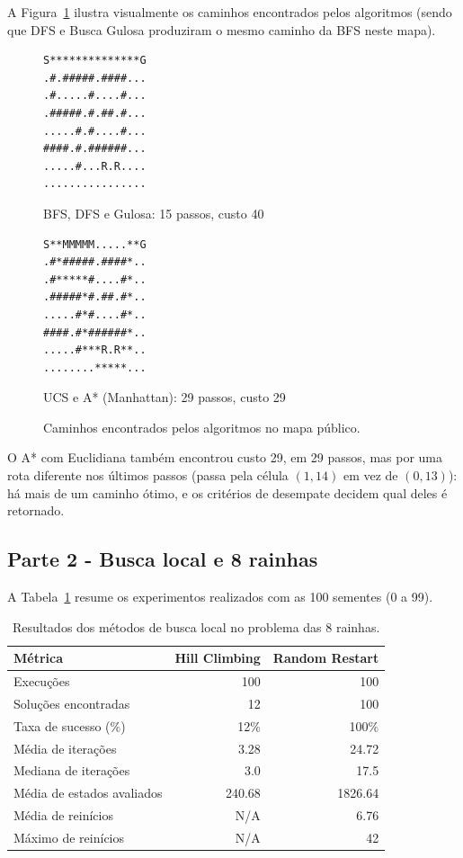 \documentclass[12pt]{article}
\begin{document}
A Figura~\ref{fig:caminhos} ilustra visualmente os caminhos encontrados pelos algoritmos (sendo que DFS e Busca Gulosa produziram o mesmo caminho da BFS neste mapa).

\begin{figure}[H]
\centering
\begin{minipage}{0.48\textwidth}\scriptsize\begin{verbatim}
S**************G
.#.#####.####...
.#.....#....#...
.#####.#.##.#...
.....#.#....#...
####.#.######...
.....#...R.R....
................
\end{verbatim}
\centering BFS, DFS e Gulosa: 15 passos, custo 40
\end{minipage}
\begin{minipage}{0.48\textwidth}\scriptsize\begin{verbatim}
S**MMMMM.....**G
.#*#####.####*..
.#*****#....#*..
.#####*#.##.#*..
.....#*#....#*..
####.#*######*..
.....#***R.R**..
........*****...
\end{verbatim}
\centering UCS e A* (Manhattan): 29 passos, custo 29
\end{minipage}
\caption{Caminhos encontrados pelos algoritmos no mapa público.}
\label{fig:caminhos}
\end{figure}

O A* com Euclidiana também encontrou custo 29, em 29 passos, mas por uma rota diferente nos últimos passos (passa pela célula $(1,14)$ em vez de $(0,13)$): há mais de um caminho ótimo, e os critérios de desempate decidem qual deles é retornado.

\subsection{Parte 2 - Busca local e 8 rainhas}
A Tabela~\ref{tab:queens} resume os experimentos realizados com as 100 sementes (0 a 99).

\begin{table}[H]
\centering
\caption{Resultados dos métodos de busca local no problema das 8 rainhas.}
\label{tab:queens}
\begin{tabularx}{\textwidth}{Xrr}
\toprule
Métrica & Hill Climbing & Random Restart \\
\midrule
Execuções & 100 & 100 \\
Soluções encontradas & 12 & 100 \\
Taxa de sucesso (\%) & 12\% & 100\% \\
Média de iterações & 3.28 & 24.72 \\
Mediana de iterações & 3.0 & 17.5 \\
Média de estados avaliados & 240.68 & 1826.64 \\
Média de reinícios & N/A & 6.76 \\
Máximo de reinícios & N/A & 42 \\
\bottomrule
\end{tabularx}
\end{table}
\end{document}
